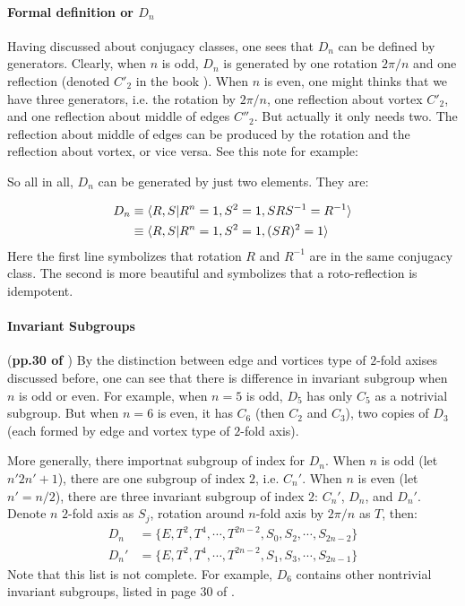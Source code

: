 \paragraph{Formal definition or $D_n$} Having discussed about
conjugacy classes, one sees that $D_n$ can be defined by generators.
Clearly, when $n$ is odd, $D_n$ is generated by one rotation $2\pi/n$
and one reflection (denoted $C'_2$ in the book \cite{book}). When $n$
is even, one might thinks that we have three generators, i.e. the
rotation by $2\pi/n$, one reflection about vortex $C'_2$, and one
reflection about middle of edges $C''_2$. But actually it only needs
two. The reflection about middle of edges can be produced by the
rotation and the reflection about vortex, or vice versa. See this
note for example:


So all in all, $D_n$ can be generated by just two elements. They are:
\begin{fact}
\label{fact:point-group-formal-def-dn}
\begin{align}
    D_n &\equiv \braket{R,S|R^n=1,S^2=1,SRS^{-1}=R^{-1}} \\
        &\equiv \braket{R,S|R^n=1,S^2=1,(SR)^2=1}
\end{align}
Here the first line symbolizes that rotation $R$ and $R^{-1}$ are in
the same conjugacy class. The second is more beautiful and symbolizes
that a roto-reflection is idempotent.
\end{fact}

\paragraph{Invariant Subgroups} (\textbf{pp.30 of \cite{book}})
By the distinction between edge and vortices type of $2$-fold axises
discussed before, one can see that there is difference in invariant
subgroup when $n$ is odd or even. For example, when $n=5$ is odd,
$D_5$ has only $C_5$ as a notrivial subgroup. But when
$n=6$ is even, it has $C_6$ (then $C_2$ and $C_3$), two copies of
$D_3$ (each formed by edge and vortex type of $2$-fold axis).

More generally, there importnat subgroup of index for $D_n$. When $n$
is odd (let $n'2n'+1$), there are one subgroup of index $2$, i.e.
$C_n'$. When $n$ is even (let $n'=n/2$), there are three invariant
subgroup of index $2$: $C_n'$, $D_n$, and $D_n'$. Denote $n$ $2$-fold
axis as $S_j$, rotation around $n$-fold axis by $2\pi/n$ as $T$,
then:
\begin{align}
    D_n &= \{E, T^2,T^4,\cdots,T^{2n-2},S_0,S_2,\cdots,S_{2n-2}\} \\
    D_n' &= \{E, T^2,T^4,\cdots,T^{2n-2},S_1,S_3,\cdots,S_{2n-1}\}
\end{align}
Note that this list is not complete. For example, $D_6$ contains other
nontrivial invariant subgroups, listed in page 30 of \cite{book}.

